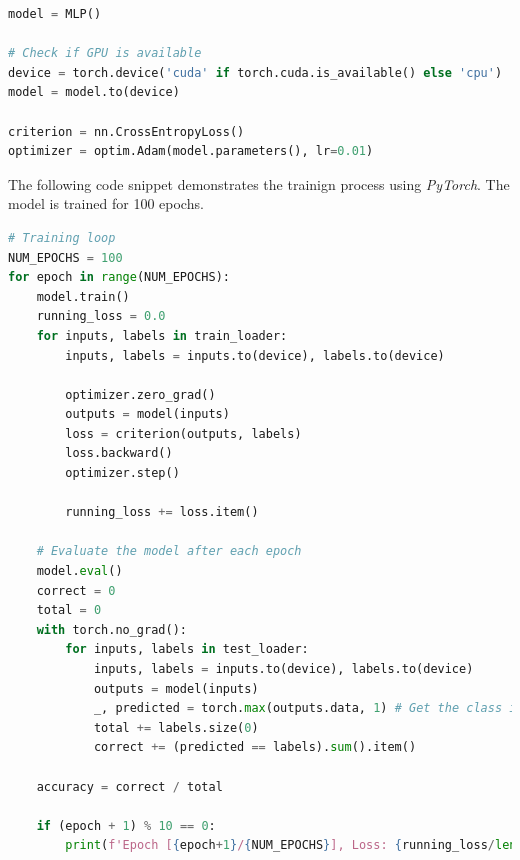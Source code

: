 \documentclass{article}
\begin{document}
\begin{lstlisting}[language=Python]
model = MLP()

# Check if GPU is available
device = torch.device('cuda' if torch.cuda.is_available() else 'cpu')
model = model.to(device)

criterion = nn.CrossEntropyLoss()
optimizer = optim.Adam(model.parameters(), lr=0.01)
\end{lstlisting}

The following code snippet demonstrates the trainign process using \textit{PyTorch}. The model is trained for 100 epochs.

\begin{lstlisting}[language=Python]
# Training loop
NUM_EPOCHS = 100
for epoch in range(NUM_EPOCHS):
    model.train()
    running_loss = 0.0
    for inputs, labels in train_loader:
        inputs, labels = inputs.to(device), labels.to(device)
        
        optimizer.zero_grad()
        outputs = model(inputs)
        loss = criterion(outputs, labels)
        loss.backward()
        optimizer.step()

        running_loss += loss.item()

    # Evaluate the model after each epoch
    model.eval()
    correct = 0
    total = 0
    with torch.no_grad():
        for inputs, labels in test_loader:
            inputs, labels = inputs.to(device), labels.to(device)
            outputs = model(inputs)
            _, predicted = torch.max(outputs.data, 1) # Get the class index with the highest probability
            total += labels.size(0)
            correct += (predicted == labels).sum().item()

    accuracy = correct / total

    if (epoch + 1) % 10 == 0:
        print(f'Epoch [{epoch+1}/{NUM_EPOCHS}], Loss: {running_loss/len(train_loader):.4f}, Accuracy: {accuracy * 100:.2f}%')
\end{lstlisting}
\end{document}
